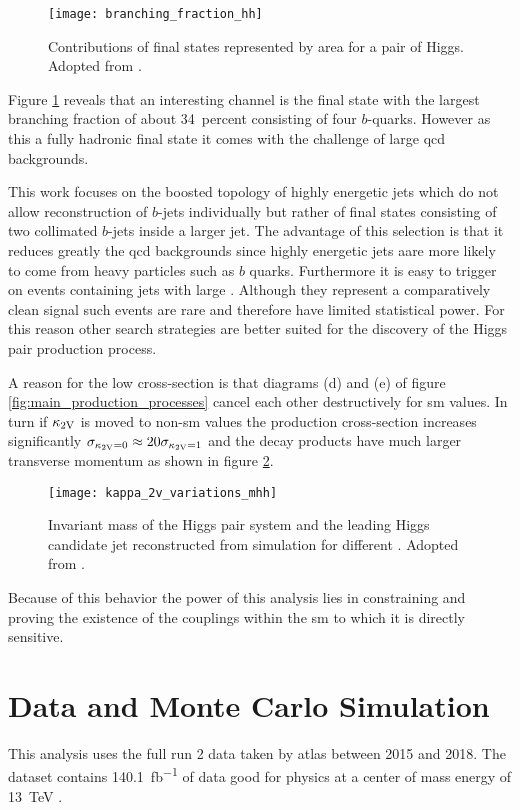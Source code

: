 \begin{figure}
    \centering
    \texttt{[image: branching\_fraction\_hh]}
    \caption[]{Contributions of final states represented by area for a pair of Higgs. Adopted from \citep{ATL-COM-PHYS-2020-083}.}
    \label{fig:branching_fraction_hh}
\end{figure}
Figure \ref{fig:branching_fraction_hh} reveals that an interesting channel is the final state with the largest branching fraction of about \qty[]{34}{percent} consisting of four $b$-quarks. However as this a fully hadronic final state it comes with the challenge of large \ac{qcd} backgrounds.

This work focuses on the boosted topology of highly energetic jets which do not allow reconstruction of $b$-jets individually but rather of final states consisting of two collimated $b$-jets inside a larger jet. The advantage of this selection is that it reduces greatly the \ac{qcd} backgrounds since highly energetic jets aare more likely to come from heavy particles such as $b$ quarks. Furthermore it is easy to trigger on events containing jets with large \pt. Although they represent a comparatively clean signal such events are rare and therefore have limited statistical power. For this reason other search strategies are better suited for the discovery of the Higgs pair production process.

A reason for the low cross-section is that diagrams (d) and (e) of figure \ref{fig:main_production_processes} cancel each other destructively for \ac{sm} values. In turn if $\kappa_{\text{2V}}$ is moved to non-\ac{sm} values the production cross-section increases significantly $\sigma_{\kappa_{\text{2V}}=0}\approx 20\sigma_{\kappa_{\text{2V}}=1}$ \citep{bishara2017higgs} and the decay products have much larger transverse momentum as shown in figure \ref{fig:kappa_2v_variations_mhh}.
\begin{figure}
    \centering
    \texttt{[image: kappa\_2v\_variations\_mhh]}
    \caption[]{Invariant mass of the Higgs pair system and the leading Higgs candidate jet \pt  reconstructed from simulation for different \ktwov. Adopted from \citep{ATL-PHYS-PUB-2019-007}.}
    \label{fig:kappa_2v_variations_mhh}
\end{figure}
Because of this behavior the power of this analysis lies in constraining and proving the existence of the \ktwov couplings within the \ac{sm} to which it is directly sensitive.

\section{Data and Monte Carlo Simulation}
This analysis uses the full run 2 data taken by \ac{atlas} between 2015 and 2018. The dataset contains \qty[]{140.1}{fb^{-1}} of data good for physics at a center of mass energy of \qty[]{13}{TeV} \citep{DAPR-2021-01}.

